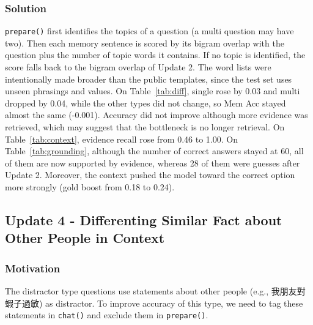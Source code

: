 \documentclass{article}
\begin{document}
\subsubsection{Solution}
\texttt{prepare()} first identifies the topics of a question (a multi question may have two).
Then each memory sentence is scored by its bigram overlap with the question plus the number of topic words it
contains.
If no topic is identified, the score falls back to the bigram overlap of Update 2.
The word lists were intentionally made broader than the public templates, since the test set uses unseen phrasings and values.
On Table~\ref{tab:diff}, single rose by 0.03 and multi dropped by 0.04, while the other types did not change, so Mem Acc stayed almost the same (-0.001).
Accuracy did not improve although more evidence was retrieved, which may suggest that the bottleneck is no longer retrieval.
On Table~\ref{tab:context}, evidence recall rose from 0.46 to 1.00.
On Table~\ref{tab:grounding}, although the number of correct answers stayed at 60, all of them are now supported by evidence, whereas 28 of them were guesses after Update 2.
Moreover, the context pushed the model toward the correct option more strongly (gold boost from 0.18 to 0.24).
\subsection{Update 4 - Differenting Similar Fact about Other People in Context}
\subsubsection{Motivation}
The distractor type questions use statements about other people (e.g., 我朋友對蝦子過敏) as distractor.
To improve accuracy of this type, we need to tag these statements in \texttt{chat()} and exclude them in \texttt{prepare()}.
\end{document}
